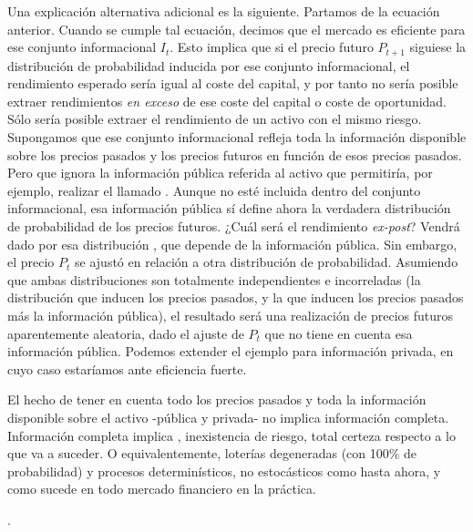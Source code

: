 \documentclass{nuevotema}
\begin{document}
Una explicación alternativa adicional es la siguiente. Partamos de la ecuación anterior. Cuando se cumple tal ecuación, decimos que el mercado es eficiente para ese conjunto informacional $I_t$. Esto implica que si el precio futuro $P_{t+1}$ siguiese la distribución de probabilidad inducida por ese conjunto informacional, el rendimiento esperado sería igual al coste del capital, y por tanto no sería posible extraer rendimientos \textit{en exceso} de ese coste del capital o coste de oportunidad. Sólo sería posible extraer el rendimiento de un activo con el mismo riesgo. Supongamos que ese conjunto informacional refleja toda la información disponible sobre los precios pasados y los precios futuros en función de esos precios pasados. Pero que ignora la información pública referida al activo que permitiría, por ejemplo, realizar el llamado . Aunque no esté incluida dentro del conjunto informacional, esa información pública sí define ahora la verdadera distribución de probabilidad de los precios futuros. ¿Cuál será el rendimiento \textit{ex-post}? Vendrá dado por esa distribución , que depende de la información pública. Sin embargo, el precio $P_t$ se ajustó en relación a otra distribución de probabilidad. Asumiendo que ambas distribuciones son totalmente independientes e incorreladas (la distribución que inducen los precios pasados, y la que inducen los precios pasados más la información pública), el resultado será una realización de precios futuros aparentemente aleatoria, dado el ajuste de $P_t$ que no tiene en cuenta esa información pública. Podemos extender el ejemplo para información privada, en cuyo caso estaríamos ante eficiencia fuerte.

El hecho de tener en cuenta todo los precios pasados y toda la información disponible sobre el activo -pública y privada- no implica información completa. Información completa implica , inexistencia de riesgo, total certeza respecto a lo que va a suceder. O equivalentemente, loterías degeneradas (con 100\% de probabilidad) y procesos determinísticos, no estocásticos como hasta ahora, y como sucede en todo mercado financiero en la práctica.


 .
\end{document}

